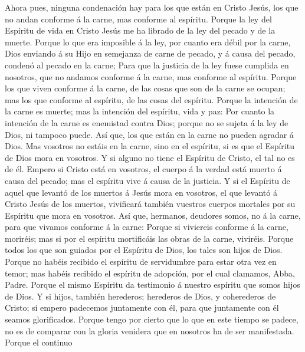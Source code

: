  Ahora pues, ninguna condenación hay para los que están en
Cristo Jesús, los que no andan conforme á la carne, mas conforme al
espíritu.  Porque la ley del Espíritu de vida en Cristo
Jesús me ha librado de la ley del pecado y de la muerte. 
Porque lo que era imposible á la ley, por cuanto era débil por la carne,
Dios enviando á su Hijo en semejanza de carne de pecado, y á causa del
pecado, condenó al pecado en la carne;  Para que la
justicia de la ley fuese cumplida en nosotros, que no andamos conforme á
la carne, mas conforme al espíritu.  Porque los que viven
conforme á la carne, de las cosas que son de la carne se ocupan; mas los
que conforme al espíritu, de las cosas del espíritu. 
Porque la intención de la carne es muerte; mas la intención del
espíritu, vida y paz:  Por cuanto la intención de la carne
es enemistad contra Dios; porque no se sujeta á la ley de Dios, ni
tampoco puede.  Así que, los que están en la carne no
pueden agradar á Dios.  Mas vosotros no estáis en la
carne, sino en el espíritu, si es que el Espíritu de Dios mora en
vosotros. Y si alguno no tiene el Espíritu de Cristo, el tal no es de
él.  Empero si Cristo está en vosotros, el cuerpo á la
verdad está muerto á causa del pecado; mas el espíritu vive á causa de
la justicia.  Y si el Espíritu de aquel que levantó de
los muertos á Jesús mora en vosotros, el que levantó á Cristo Jesús de
los muertos, vivificará también vuestros cuerpos mortales por su
Espíritu que mora en vosotros.  Así que, hermanos,
deudores somos, no á la carne, para que vivamos conforme á la carne:
 Porque si viviereis conforme á la carne, moriréis; mas
si por el espíritu mortificáis las obras de la carne, viviréis.
 Porque todos los que son guiados por el Espíritu de
Dios, los tales son hijos de Dios.  Porque no habéis
recibido el espíritu de servidumbre para estar otra vez en temor; mas
habéis recibido el espíritu de adopción, por el cual clamamos, Abba,
Padre.  Porque el mismo Espíritu da testimonio á nuestro
espíritu que somos hijos de Dios.  Y si hijos, también
herederos; herederos de Dios, y coherederos de Cristo; si empero
padecemos juntamente con él, para que juntamente con él seamos
glorificados.  Porque tengo por cierto que lo que en este
tiempo se padece, no es de comparar con la gloria venidera que en
nosotros ha de ser manifestada.  Porque el continuo
